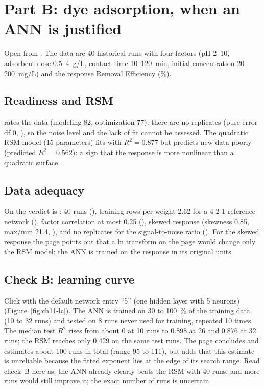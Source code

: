 \section{Part B: dye adsorption, when an ANN is justified}
\label{sec:ch11-dye}
Open  from . The data are 40
historical runs with four factors (pH 2--10, adsorbent dose 0.5--4~g/L, contact time 10--120~min, initial concentration
20--200~mg/L) and the response Removal Efficiency (\%).

\subsection{Readiness and RSM}
 rates the data  (modeling 82, optimization 77): there are no
replicates (pure error df 0, ), so the noise level and the lack of fit cannot be assessed. The quadratic RSM
model (15 parameters) fits with $R^2=0.877$ but predicts new data poorly (predicted $R^2=0.562$): a sign that the
response is more nonlinear than a quadratic surface.

\subsection{Data adequacy}
On  the  verdict is : 40 runs (), training rows per
weight 2.62 for a 4-2-1 reference network (), factor correlation at most 0.25 (), skewed response
(skewness 0.85, max/min 21.4, ), and no replicates for the signal-to-noise ratio (). For the
skewed response the page points out that a ln transform on the  page would change only the RSM model:
the ANN is trained on the response in its original units.

\subsection{Check B: learning curve}
Click  with the default network entry ``5'' (one hidden layer with 5 neurons)
(Figure~\ref{fig:ch11-lc}). The ANN is trained on 30 to 100~\% of the training data (10 to 32 runs) and tested on
8 runs never used for training, repeated 10 times. The median test $R^2$ rises from about 0 at 10 runs to 0.898 at 26
and 0.876 at 32 runs; the RSM reaches only 0.429 on the same test runs. The page concludes  and estimates about 100 runs in total (range 95 to 111), but adds that this estimate is unreliable because the
fitted exponent lies at the edge of its search range. Read check~B here as: the ANN already clearly beats the RSM with
40 runs, and more runs would still improve it; the exact number of runs is uncertain.

